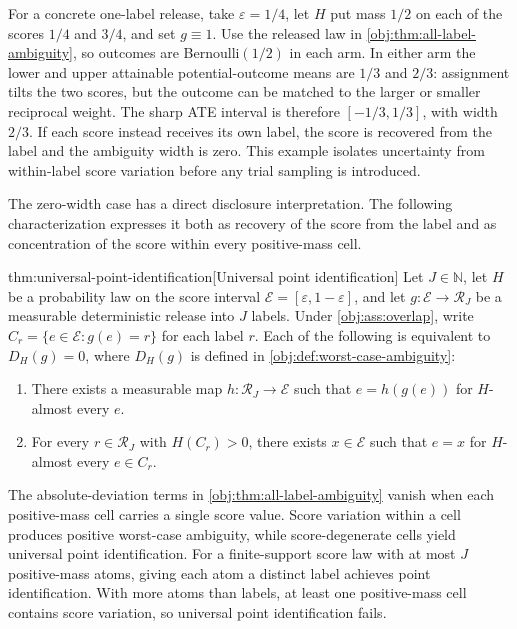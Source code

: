 For a concrete one-label release, take \(\varepsilon=1/4\), let \(H\) put mass \(1/2\) on each of the scores \(1/4\) and \(3/4\), and set \(g\equiv1\). Use the released law in \cref{obj:thm:all-label-ambiguity}, so outcomes are Bernoulli\((1/2)\) in each arm. In either arm the lower and upper attainable potential-outcome means are \(1/3\) and \(2/3\): assignment tilts the two scores, but the outcome can be matched to the larger or smaller reciprocal weight. The sharp ATE interval is therefore \([-1/3,1/3]\), with width \(2/3\). If each score instead receives its own label, the score is recovered from the label and the ambiguity width is zero. This example isolates uncertainty from within-label score variation before any trial sampling is introduced.

The zero-width case has a direct disclosure interpretation. The following characterization expresses it both as recovery of the score from the label and as concentration of the score within every positive-mass cell.

\begin{theoremv}{thm:universal-point-identification}[Universal point identification]
Let \(J\in\mathbb N\), let \(H\) be a probability law on the score interval \(\mathcal E=[\varepsilon,1-\varepsilon]\), and let \(g:\mathcal E\to\mathcal R_J\) be a measurable deterministic release into \(J\) labels. Under \cref{obj:ass:overlap}, write \(C_r=\{e\in\mathcal E:g(e)=r\}\) for each label \(r\). Each of the following is equivalent to \(D_H(g)=0\), where \(D_H(g)\) is defined in \cref{obj:def:worst-case-ambiguity}:
\begin{enumerate}
\item There exists a measurable map \(h:\mathcal R_J\to\mathcal E\) such that \(e=h(g(e))\) for \(H\)-almost every \(e\).
\item For every \(r\in\mathcal R_J\) with \(H(C_r)>0\), there exists \(x\in\mathcal E\) such that \(e=x\) for \(H\)-almost every \(e\in C_r\).
\end{enumerate}
\end{theoremv}

The absolute-deviation terms in \cref{obj:thm:all-label-ambiguity} vanish when each positive-mass cell carries a single score value. Score variation within a cell produces positive worst-case ambiguity, while score-degenerate cells yield universal point identification. For a finite-support score law with at most \(J\) positive-mass atoms, giving each atom a distinct label achieves point identification. With more atoms than labels, at least one positive-mass cell contains score variation, so universal point identification fails.
